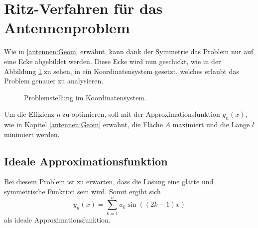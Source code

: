 %
%
% 
%
%

\usetikzlibrary{pgfplots.fillbetween}

\section{Ritz-Verfahren für das Antennenproblem\label{antennen:ritzAnw}}

Wie in \ref{antennen:Geom} erwähnt, kann dank der Symmetrie das Problem nur auf eine Ecke abgebildet werden. 
Diese Ecke wird nun geschickt, wie in der Abbildung \ref{antennen:koordSysBsp} zu sehen, 
in ein Koordinatensystem gesetzt, welches erlaubt das Problem genauer zu analysieren.
\begin{figure}
	\centering
	\caption{Problemstellung im Koordinatensystem.}
	\label{antennen:koordSysBsp}
\end{figure}

Um die Effizienz $\eta$ zu optimieren, soll mit der Approximationsfunktion
$y_n(x)$, wie in Kapitel \ref{antennen:Geom} erwähnt, die Fläche $A$ 
maximiert und die Länge $l$ minimiert werden.

\subsection{Ideale Approximationsfunktion\label{antennen:unsereApproxFunkt}}

Bei diesem Problem ist zu erwarten, dass die Lösung eine glatte und symmetrische
Funktion sein wird. Somit ergibt sich
\begin{equation}
	y_n(x)
	= 
	\sum_{k=1}^n a_k\sin((2k-1)x)
	\label{antennen:unserRitz}
\end{equation}
als ideale Approximationsfunktion. 
%

